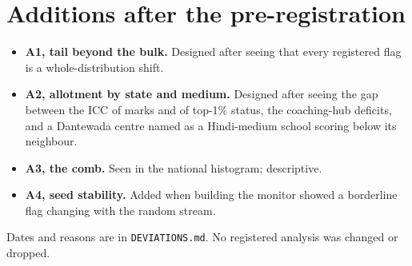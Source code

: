 \documentclass[11pt]{article}
\begin{document}
\section{Additions after the pre-registration}
\begin{itemize}[leftmargin=1.2em]
\item \textbf{A1, tail beyond the bulk.} Designed after seeing that every registered flag is a whole-distribution shift.
\item \textbf{A2, allotment by state and medium.} Designed after seeing the gap between the ICC of marks and of top-1\% status, the coaching-hub deficits, and a Dantewada centre named as a Hindi-medium school scoring below its neighbour.
\item \textbf{A3, the comb.} Seen in the national histogram; descriptive.
\item \textbf{A4, seed stability.} Added when building the monitor showed a borderline flag changing with the random stream.
\end{itemize}
Dates and reasons are in \texttt{DEVIATIONS.md}. No registered analysis was changed or dropped.
\end{document}
